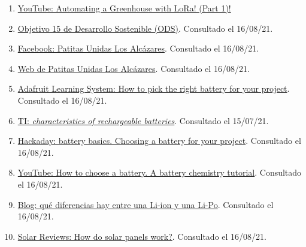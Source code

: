 \documentclass[12pt]{article}
\begin{document}
\begin{enumerate}
			\item
			\label{bib: video invernadero}
			\href{https://www.youtube.com/watch?v=2YJHcGQnpAk}{YouTube: Automating a Greenhouse with LoRa! (Part 1)!}
			
			\item 
			\label{bib: ods}
			\href{https://www.un.org/sustainabledevelopment/es/biodiversity/}{Objetivo 15 de Desarrollo Sostenible (ODS)}. Consultado el 16/08/21.
			
			\item 
			\label{bib: fb patitas}
			\href{https://www.facebook.com/patitasunidaslosalcazares/}{Facebook: Patitas Unidas Los Alcázares}. Consultado el 16/08/21.
			
			\item 
			\label{bib: web patitas}
			\href{https://patitasunidas.org/}{Web de Patitas Unidas Los Alcázares}. Consultado el 16/08/21.
			
			\item 
			\label{bib: adafruit pick the right battery}
			\href{https://learn.adafruit.com/all-about-batteries/how-to-pick-the-right-battery-for-your-project}{Adafruit Learning System: How to pick the right battery for your project}. Consultado el 16/08/21.
			
			\item
			\label{bib: TI rechargeable batteries}
			\href{https://www.ti.com/lit/an/snva533/snva533.pdf}{TI: \textit{characteristics of rechargeable batteries}}. Consultado el 15/07/21.
			
			\item 
			\label{bib: Hackaday battery basics}
			\href{https://hackaday.com/2014/12/16/battery-basics-choosing-a-battery-for-your-project/}{Hackaday: battery basics. Choosing a battery for your project}. Consultado el 16/08/21.

			\item 
			\label{bib: YouTube How to choose  a battery}
			\href{https://www.youtube.com/watch?v=saxYilLJ7yw}{YouTube: How to choose a battery. A battery chemistry tutorial}. Consultado el 16/08/21.
			
			\item 
			\label{bib: blog diferencias li-ion y li-po}
			\href{https://blog.330ohms.com/2020/06/22/que-diferencias-hay-entre-una-li-po-y-una-li-ion/}{Blog: qué diferencias hay entre una Li-ion y una Li-Po}. Consultado el 16/08/21.

			\item 
			\label{bib: solar reviews how solar panels work}
			\href{https://www.solarreviews.com/blog/how-do-solar-panels-work}{Solar Reviews: How do solar panels work?}. Consultado el 16/08/21.
			

\end{enumerate}
\end{document}
